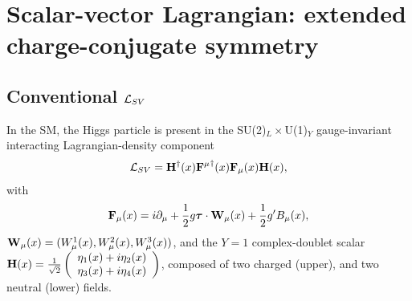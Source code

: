 \documentclass[12pt]{article}
\renewcommand\[{\begin{dmath}}
\renewcommand\]{\end{dmath}}
\newcommand{\boldmathtau}{\mbox{\boldmath$\tau$\unboldmath}}
\begin{document}
\section{Scalar-vector Lagrangian: extended charge-conjugate symmetry }
\subsection{Conventional $ {\cal L}_{SV}$ }
In the  SM, the  Higgs particle is present\cite{Glashow} in the  SU(2)$_L\times $U(1)$_Y$  gauge-invariant interacting Lagrangian-density component
\begin{eqnarray}\label{LSVConventinal}  {\cal L}_{SV}= {\bf H}^\dagger(x) {{\bf F}^\mu}^\dagger (x)  {\bf F}_\mu(x) {\bf H}(x),\end{eqnarray} with \begin{eqnarray}\label{F}{\bf F}_\mu(x)= i \partial_\mu+\frac{1}{2}g  {\boldmathtau}\cdot {\bf W_\mu}(x)+\frac{1}{2}g'B_\mu(x),\end{eqnarray} %
 ${\bf W_\mu}(x)=(W^1_\mu(x),W^2_\mu(x),W^3_\mu(x))$,   and  the $Y=1$
  complex-doublet  scalar
  ${\bf H}(x)=\frac{1}{\sqrt{2}} \left(\begin{array}{c}
  \eta_1(x)+i\eta_2(x) \\
  \eta_3(x)+i\eta_4(x)
\end{array}\right)$, composed of two  charged (upper), and two neutral  (lower)  fields.
\end{document}
